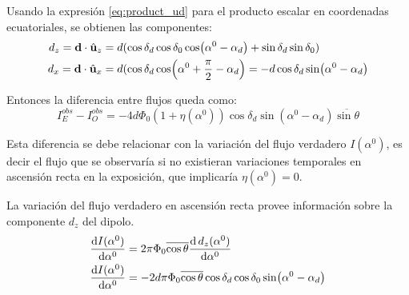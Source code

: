    

    
    Usando la expresión \ref{eq:product_ud} para el producto escalar en coordenadas ecuatoriales, se obtienen las componentes:
    \begin{align*}
        d_z=\textbf{d}\cdot\hat{\bf{u}}_z &= d (\cos\delta_d \cos\delta_0 \cos(\alpha^0 - \alpha_d) + \sin\delta_d  \sin\delta_0)\\
        d_x=\textbf{d}\cdot\hat{\bf{u}}_x &= d (\cos\delta_d \cos(\alpha^0 +\frac{\pi}{2} - \alpha_d) 
        = -d\cos\delta_d \sin(\alpha^0  - \alpha_d)
    \end{align*}
    
     Entonces la diferencia entre flujos queda como:
    \begin{equation}
        I^{obs}_E -  I^{obs}_O =-4d \Phi_0 (1+ \eta(\alpha^0)) \cos\delta_d \sin(\alpha^0  - \alpha_d)\overline{\sin\theta}
        \label{resta}
    \end{equation}

    Esta diferencia se debe relacionar con la variación del flujo verdadero $I(\alpha^0)$, es decir el flujo que se observaría si no existieran variaciones temporales en ascensión recta en la exposición, que implicaría $\eta(\alpha^0)=0$. 

    La variación del flujo verdadero en ascensión recta provee información sobre la componente $d_z$ del dipolo. 
    \begin{align}
        \dv{I(\alpha^0)}{\alpha^0}  & = 2\pi\Phi_0 \overline{\cos\theta} \dv{\,d_z(\alpha^0) }{\alpha^0}\\ 
        \dv{I(\alpha^0)}{\alpha^0} &= -2d\pi\Phi_0 \overline{\cos\theta}\cos\delta_d \cos\delta_0 \sin(\alpha^0 - \alpha_d) \label{total_flux}
    \end{align}

